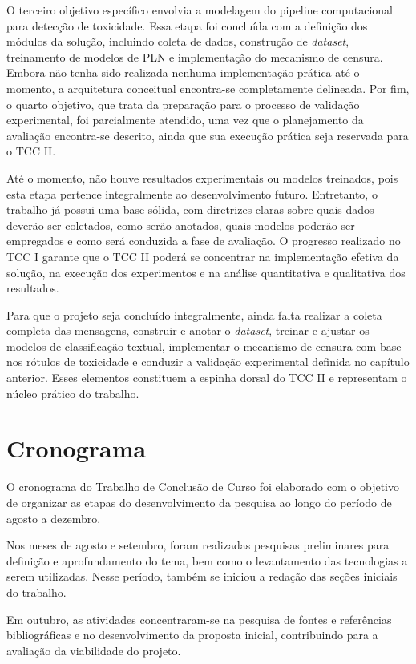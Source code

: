 \documentclass{eic-bcc-tcc}
\begin{document}
O terceiro objetivo específico envolvia a modelagem do pipeline computacional para detecção de toxicidade. Essa etapa foi concluída com a definição dos módulos da solução, incluindo coleta de dados, construção de \textit{dataset}, treinamento de modelos de PLN e implementação do mecanismo de censura. Embora não tenha sido realizada nenhuma implementação prática até o momento, a arquitetura conceitual encontra-se completamente delineada. Por fim, o quarto objetivo, que trata da preparação para o processo de validação experimental, foi parcialmente atendido, uma vez que o planejamento da avaliação encontra-se descrito, ainda que sua execução prática seja reservada para o TCC II.

Até o momento, não houve resultados experimentais ou modelos treinados, pois esta etapa pertence integralmente ao desenvolvimento futuro. Entretanto, o trabalho já possui uma base sólida, com diretrizes claras sobre quais dados deverão ser coletados, como serão anotados, quais modelos poderão ser empregados e como será conduzida a fase de avaliação. O progresso realizado no TCC I garante que o TCC II poderá se concentrar na implementação efetiva da solução, na execução dos experimentos e na análise quantitativa e qualitativa dos resultados.

Para que o projeto seja concluído integralmente, ainda falta realizar a coleta completa das mensagens, construir e anotar o \textit{dataset}, treinar e ajustar os modelos de classificação textual, implementar o mecanismo de censura com base nos rótulos de toxicidade e conduzir a validação experimental definida no capítulo anterior. Esses elementos constituem a espinha dorsal do TCC II e representam o núcleo prático do trabalho.

\section{Cronograma}

O cronograma do Trabalho de Conclusão de Curso foi elaborado com o objetivo de organizar as etapas do desenvolvimento da pesquisa ao longo do período de agosto a dezembro.

Nos meses de agosto e setembro, foram realizadas pesquisas preliminares para definição e aprofundamento do tema, bem como o levantamento das tecnologias a serem utilizadas. Nesse período, também se iniciou a redação das seções iniciais do trabalho.

Em outubro, as atividades concentraram-se na pesquisa de fontes e referências bibliográficas e no desenvolvimento da proposta inicial, contribuindo para a avaliação da viabilidade do projeto.
\end{document}
